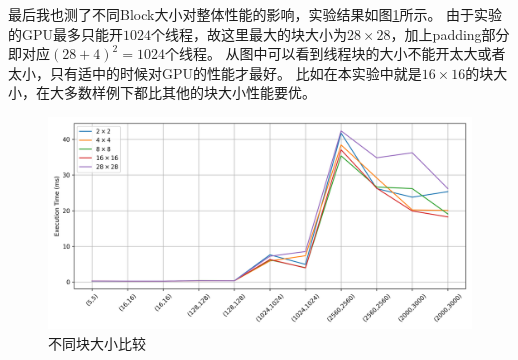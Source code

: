 \documentclass[logo,reportComp]{thesis}
\begin{document}
最后我也测了不同Block大小对整体性能的影响，实验结果如图\ref{fig:blocksize}所示。
由于实验的GPU最多只能开$1024$个线程，故这里最大的块大小为$28\times 28$，加上padding部分即对应$(28+4)^2=1024$个线程。
从图中可以看到线程块的大小不能开太大或者太小，只有适中的时候对GPU的性能才最好。
比如在本实验中就是$16\times 16$的块大小，在大多数样例下都比其他的块大小性能要优。
\begin{figure}[H]
\centering
\includegraphics[width=\linewidth]{fig/blocksize.png}
\caption{不同块大小比较}
\label{fig:blocksize}
\end{figure}

\end{document}
